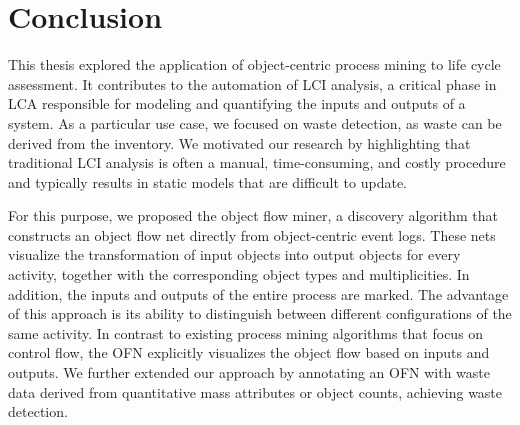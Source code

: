 \chapter{Conclusion}
\label{chap:conclusion}

This thesis explored the application of object-centric process mining to life cycle assessment.
It contributes to the automation of LCI analysis, a critical phase in LCA responsible for modeling and quantifying the inputs and outputs of a system.
As a particular use case, we focused on waste detection, as waste can be derived from the inventory.
We motivated our research by highlighting that traditional LCI analysis is often a manual, time-consuming, and costly procedure and typically results in static models that are difficult to update.




For this purpose, we proposed the object flow miner, a discovery algorithm that constructs an object flow net directly from object-centric event logs.
These nets visualize the transformation of input objects into output objects for every activity, together with the corresponding object types and multiplicities.
In addition, the inputs and outputs of the entire process are marked.
The advantage of this approach is its ability to distinguish between different configurations of the same activity.
In contrast to existing process mining algorithms that focus on control flow, the OFN explicitly visualizes the object flow based on inputs and outputs.
We further extended our approach by annotating an OFN with waste data derived from quantitative mass attributes or object counts, achieving waste detection.



